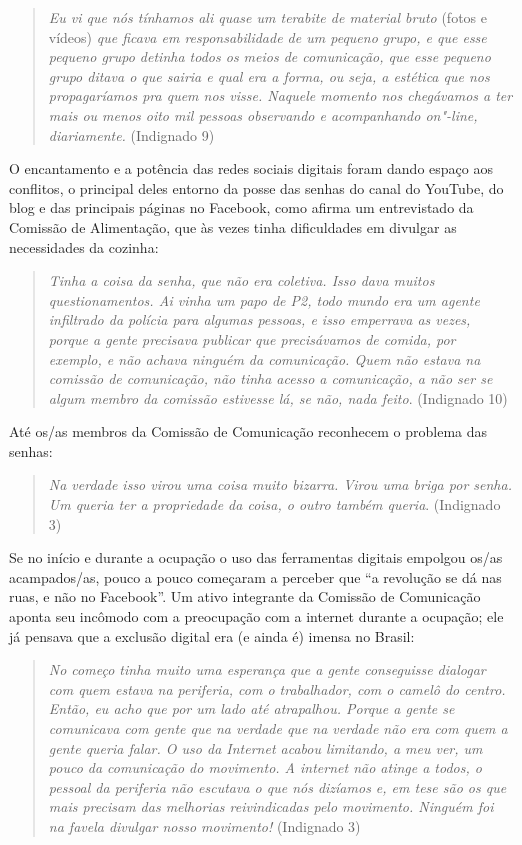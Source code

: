 \begin{quote}
\emph{Eu vi que nós tínhamos ali quase um terabite de material bruto}
(fotos e vídeos) \emph{que ficava em responsabilidade de um pequeno
grupo, e que esse pequeno grupo detinha todos os meios de comunicação,
que esse pequeno grupo ditava o que sairia e qual era a forma, ou seja,
a estética que nos propagaríamos pra quem nos visse. Naquele momento nos
chegávamos a ter mais ou menos oito mil pessoas observando e
acompanhando on"-line, diariamente.} (Indignado 9)
\end{quote}

O encantamento e a potência das redes sociais digitais foram dando
espaço aos conflitos, o principal deles entorno da posse das senhas do
canal do YouTube, do blog e das principais páginas no Facebook, como
afirma um entrevistado da Comissão de Alimentação, que às vezes tinha
dificuldades em divulgar as necessidades da cozinha:

\begin{quote}
\emph{Tinha a coisa da senha, que não era coletiva. Isso dava muitos
questionamentos. Ai vinha um papo de P2, todo mundo era um agente
infiltrado da polícia para algumas pessoas, e isso emperrava as vezes,
porque a gente precisava publicar que precisávamos de comida, por
exemplo, e não achava ninguém da comunicação. Quem não estava na
comissão de comunicação, não tinha acesso a comunicação, a não ser se
algum membro da comissão estivesse lá, se não, nada feito}. (Indignado
10)
\end{quote}

Até os/as membros da Comissão de Comunicação reconhecem o problema das
senhas:

\begin{quote}
\emph{Na verdade isso virou uma coisa muito bizarra. Virou uma briga por
senha. Um queria ter a propriedade da coisa, o outro também queria}.
(Indignado 3)
\end{quote}

Se no início e durante a ocupação o uso das ferramentas digitais
empolgou os/as acampados/as, pouco a pouco começaram a perceber que ``a
revolução se dá nas ruas, e não no Facebook''. Um ativo integrante da
Comissão de Comunicação aponta seu incômodo com a preocupação com a
internet durante a ocupação; ele já pensava que a exclusão digital era
(e ainda é) imensa no Brasil:

\begin{quote}
\emph{No começo tinha muito uma esperança que a gente conseguisse
dialogar com quem estava na periferia, com o trabalhador, com o camelô
do centro. Então, eu acho que por um lado até atrapalhou. Porque a gente
se comunicava com gente que na verdade que na verdade não era com quem a
gente queria falar. O uso da Internet acabou limitando, a meu ver, um
pouco da comunicação do movimento. A internet não atinge a todos, o
pessoal da periferia não escutava o que nós dizíamos e, em tese são os
que mais precisam das melhorias reivindicadas pelo movimento. Ninguém
foi na favela divulgar nosso movimento!} (Indignado 3)
\end{quote}

